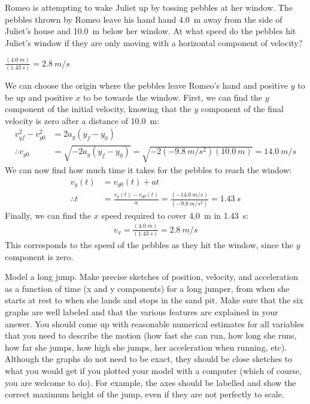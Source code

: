 \question Romeo is attempting to wake Juliet up by tossing pebbles at her window. The pebbles thrown by Romeo leave his hand hand \SI{4.0}{m} away from the side of Juliet's house and \SI{10.0}{m} below her window. At what speed do the pebbles hit Juliet's window if they are only moving with a horizontal component of velocity?

\begin{finalanswer}
$\frac{(\SI{4.0}{m})}{(\SI{1.43}{s})}=\SI{2.8}{m/s}$
\end{finalanswer}
\begin{solution}
We can choose the origin where the pebbles leave Romeo's hand and positive $y$ to be up and positive $x$ to be towards the window. First, we can find the $y$ component of the initial velocity, knowing that the $y$ component of the final velocity is zero after a distance of \SI{10.0}{m}:
\begin{align*}
v_{yf}^2-v_{y0}^2&=2a_y(y_f-y_0)\\
\therefore v_{y0}&=\sqrt{-2a_y(y_f-y_0)}=\sqrt{-2(\SI{-9.8}{m/s^2})(\SI{10.0}{m})}=\SI{14.0}{m/s}
\end{align*}
We can now find how much time it takes for the pebbles to reach the window:
\begin{align*}
v_y(t)&=v_{y0}(t)+at\\
\therefore t&= \frac{v_y(t)-v_{y0}(t)}{a}=\frac{(-\SI{14.0}{m/s})}{(\SI{-9.8}{m/s^2})}=\SI{1.43}{s}
\end{align*}
Finally, we can find the $x$ speed required to cover \SI{4.0}{m} in \SI{1.43}{s}:
\begin{align*}
v_x = \frac{(\SI{4.0}{m})}{(\SI{1.43}{s})}=\SI{2.8}{m/s}
\end{align*}
This corresponds to the speed of the pebbles as they hit the window, since the $y$ component is zero.
\end{solution}


\question Model a long jump. Make precise sketches of position, velocity, and acceleration as a function of time (x and y components) for a long jumper, from when she starts at rest to when she lands and stops in the sand pit. Make sure that the six graphs are well labeled and that the various features are explained in your answer. You should come up with reasonable numerical estimates for all variables that you need to describe the motion (how fast she can run, how long she runs, how far she jumps, how high she jumps, her acceleration when running, etc). Although the graphs do not need to be exact, they should be close sketches to what you would get if you plotted your model with a computer (which of course, you are welcome to do). For example, the axes should be labelled and show the correct maximum height of the jump, even if they are not perfectly to scale. 

